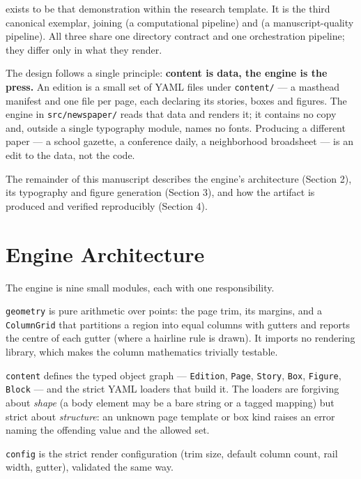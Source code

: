 \documentclass[
  english,
]{article}
\begin{document}
 exists to be that demonstration within the
research template. It is the third canonical exemplar, joining
 (a computational pipeline) and
 (a manuscript-quality pipeline). All
three share one directory contract and one orchestration pipeline; they
differ only in what they render.

The design follows a single principle: \textbf{content is data, the
engine is the press.} An edition is a small set of YAML files under
\texttt{content/} --- a masthead manifest and one file per page, each
declaring its stories, boxes and figures. The engine in
\texttt{src/newspaper/} reads that data and renders it; it contains no
copy and, outside a single typography module, names no fonts. Producing
a different paper --- a school gazette, a conference daily, a
neighborhood broadsheet --- is an edit to the data, not the code.

The remainder of this manuscript describes the engine's architecture
(Section 2), its typography and figure generation (Section 3), and how
the artifact is produced and verified reproducibly (Section 4).

\newpage

\section{Engine Architecture}\label{engine-architecture}

The engine is nine small modules, each with one responsibility.

\texttt{geometry} is pure arithmetic over points: the page trim, its
margins, and a \texttt{ColumnGrid} that partitions a region into equal
columns with gutters and reports the centre of each gutter (where a
hairline rule is drawn). It imports no rendering library, which makes
the column mathematics trivially testable.

\texttt{content} defines the typed object graph --- \texttt{Edition},
\texttt{Page}, \texttt{Story}, \texttt{Box}, \texttt{Figure},
\texttt{Block} --- and the strict YAML loaders that build it. The
loaders are forgiving about \emph{shape} (a body element may be a bare
string or a tagged mapping) but strict about \emph{structure}: an
unknown page template or box kind raises an error naming the offending
value and the allowed set.

\texttt{config} is the strict render configuration (trim size, default
column count, rail width, gutter), validated the same way.
\end{document}
